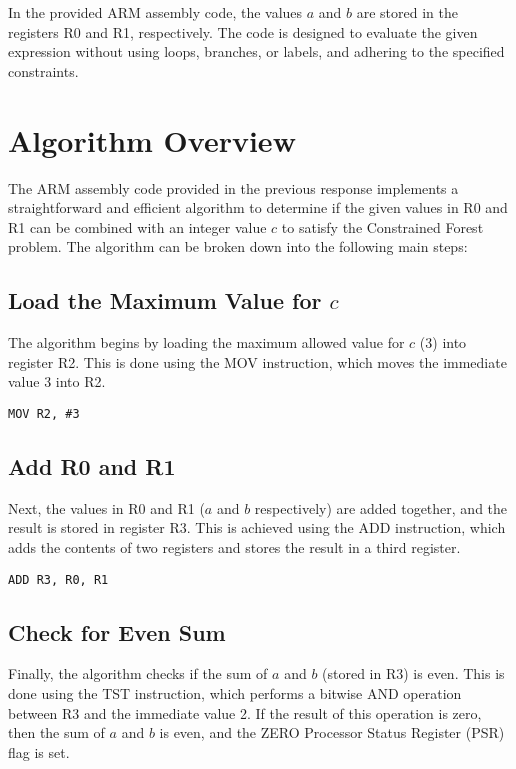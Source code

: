 In the provided ARM assembly code, the values $a$ and $b$ are stored in the registers R0 and R1, respectively. The code is designed to evaluate the given expression without using loops, branches, or labels, and adhering to the specified constraints.

\section{Algorithm Overview}

The ARM assembly code provided in the previous response implements a straightforward and efficient algorithm to determine if the given values in R0 and R1 can be combined with an integer value $c$ to satisfy the Constrained Forest problem. The algorithm can be broken down into the following main steps:

\subsection{Load the Maximum Value for $c$}

The algorithm begins by loading the maximum allowed value for $c$ (3) into register R2. This is done using the MOV instruction, which moves the immediate value 3 into R2.

\begin{verbatim}
MOV R2, #3
\end{verbatim}

\subsection{Add R0 and R1}

Next, the values in R0 and R1 ($a$ and $b$ respectively) are added together, and the result is stored in register R3. This is achieved using the ADD instruction, which adds the contents of two registers and stores the result in a third register.

\begin{verbatim}
ADD R3, R0, R1
\end{verbatim}

\subsection{Check for Even Sum}

Finally, the algorithm checks if the sum of $a$ and $b$ (stored in R3) is even. This is done using the TST instruction, which performs a bitwise AND operation between R3 and the immediate value 2. If the result of this operation is zero, then the sum of $a$ and $b$ is even, and the ZERO Processor Status Register (PSR) flag is set.

